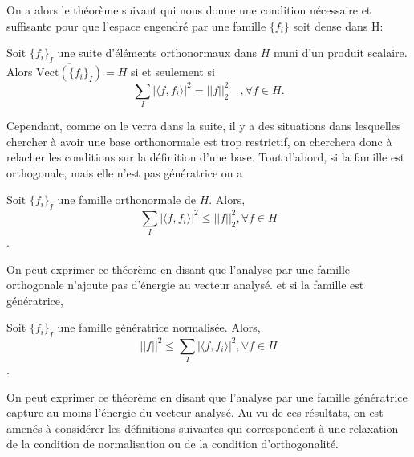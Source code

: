 On a alors le théorème suivant qui nous donne une condition nécessaire et suffisante pour que l'espace engendré par une famille $\{f_i\}$ soit dense dans H:
\begin{theoreme}
	Soit $\{f_i\}_I$ une suite d'éléments orthonormaux dans $H$ muni d'un produit scalaire.
	Alors $\overline{\text{Vect}(\{f_i\}_I)} = H$ si et seulement si 
	\begin{equation*}
		\sum_I |\langle f, f_i\rangle|^2 = ||f||_2 ^2 \quad, \forall f \in H.
	\end{equation*}
\end{theoreme}
Cependant, comme on le verra dans la suite, il y a des situations dans lesquelles chercher à avoir une base orthonormale est trop restrictif, on cherchera donc à relacher les conditions sur la définition d'une base.
\newline
Tout d'abord, si la famille est orthogonale, mais elle n'est pas génératrice on a 
\begin{theoreme}
	Soit $\{f_i\}_I$ une famille orthonormale de $H$.
	Alors,
	\begin{equation*}
		\sum_I |\langle f, f_i \rangle|^2 \leq ||f||_2 ^2, \forall f \in H
	\end{equation*}.
\end{theoreme}
On peut exprimer ce théorème en disant que l'analyse par une famille orthogonale n'ajoute pas d'énergie au vecteur analysé.
et si la famille est génératrice,
\begin{theoreme}
	Soit $\{f_i\}_I$ une famille génératrice normalisée.
	Alors,
	\begin{equation*}
		||f||^2 \leq \sum_I |\langle f, f_i \rangle|^2, \forall f \in H
	\end{equation*}.
\end{theoreme}
On peut exprimer ce théorème en disant que l'analyse par une famille génératrice capture au moins l'énergie du vecteur analysé.
Au vu de ces résultats, on est amenés à considérer les définitions suivantes qui correspondent à une relaxation de la condition de normalisation ou de la condition d'orthogonalité.
